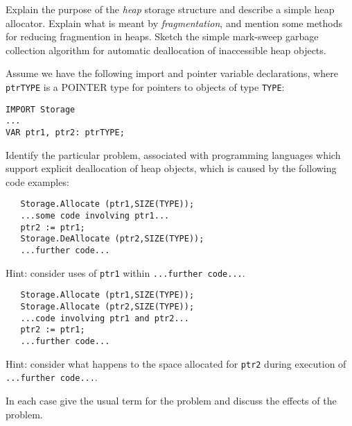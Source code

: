 \begin{questions}
\begin{subquestions}
\subquestion
Explain the purpose of the {\em heap} storage structure and
describe a simple heap allocator.  Explain what is 
meant by {\em fragmentation}, and mention some methods
for reducing fragmention in heaps.  
Sketch the simple mark-sweep garbage collection algorithm
for automatic deallocation of inaccessible heap objects.

\subquestion
Assume we have the following import and pointer variable
declarations, where \verb"ptrTYPE" is a POINTER type for pointers
to objects of type \verb"TYPE":
\begin{verbatim}
IMPORT Storage
...
VAR ptr1, ptr2: ptrTYPE;
\end{verbatim}
Identify the particular problem, 
associated 
with programming languages
which support explicit deallocation of heap objects,
which is caused by the following code examples:
\begin{subsubquestions}
\subsubquestion
\begin{verbatim}
   Storage.Allocate (ptr1,SIZE(TYPE));
   ...some code involving ptr1...
   ptr2 := ptr1;
   Storage.DeAllocate (ptr2,SIZE(TYPE));
   ...further code...
\end{verbatim}
Hint: consider uses of \verb"ptr1" within \verb"...further code...".
\subsubquestion
\begin{verbatim}
   Storage.Allocate (ptr1,SIZE(TYPE));
   Storage.Allocate (ptr2,SIZE(TYPE));
   ...code involving ptr1 and ptr2...
   ptr2 := ptr1;
   ...further code...
\end{verbatim}
Hint: consider what happens to the space allocated for 
\verb"ptr2" during execution of \verb"...further code...".
\end{subsubquestions}
In each case give the usual term for the problem and 
discuss the effects of the problem.

\end{subquestions}


\end{questions}



